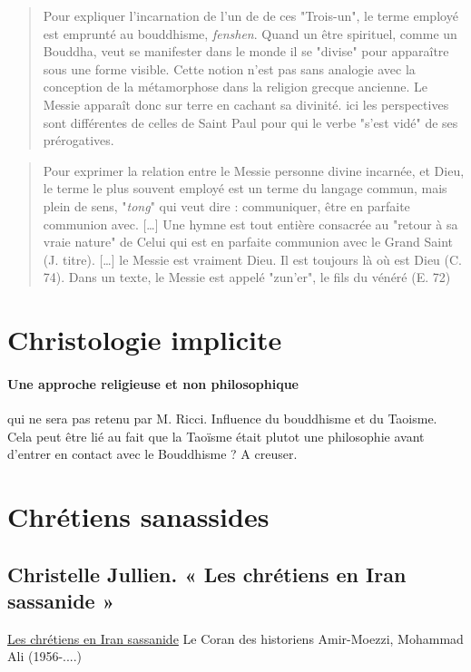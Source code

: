 \begin{quote}
    Pour expliquer l'incarnation de l'un de
de ces "Trois-un", le terme employé est emprunté au bouddhisme, \emph{fenshen}. Quand un être spirituel, comme un Bouddha, veut se manifester dans le monde il se "divise" pour apparaître sous une forme visible. Cette notion n'est pas sans analogie avec la conception de la métamorphose dans la religion grecque ancienne. Le Messie apparaît donc sur terre en cachant sa divinité. ici les perspectives sont différentes de celles de Saint Paul pour qui le verbe "s'est vidé" de ses prérogatives.  \cite[p.43]{Raguin:JesusMessieXian}
\end{quote}
\begin{quote}
    Pour exprimer la relation entre le Messie personne divine incarnée, et Dieu, le terme le plus souvent employé est un terme du langage commun, mais plein de sens, "\emph{tong}" qui veut dire : communiquer, être en parfaite communion avec. [\ldots] Une hymne est tout entière consacrée au "retour à sa vraie nature" de Celui qui est en parfaite communion avec le Grand Saint (J. titre). [\ldots] le Messie est vraiment Dieu. Il est toujours là où est Dieu (C. 74). Dans un texte, le Messie est appelé "zun'er", le fils du vénéré (E. 72) \cite[p.43]{Raguin:JesusMessieXian}
\end{quote}


\section{Christologie implicite}

\paragraph{Une approche religieuse et non philosophique} qui ne sera pas retenu par M. Ricci. Influence du bouddhisme et du Taoisme. Cela peut être lié au fait que la Taoïsme était plutot une philosophie avant d'entrer en contact avec le Bouddhisme ? A creuser.


\section{Chrétiens sanassides}

\subsection{Christelle Jullien. « Les chrétiens en Iran
sassanide »
}
\href{https://go.exlibris.link/YnGJKmGb}{Les chrétiens en Iran sassanide}
Le Coran des historiens
Amir-Moezzi, Mohammad Ali (1956-....)

